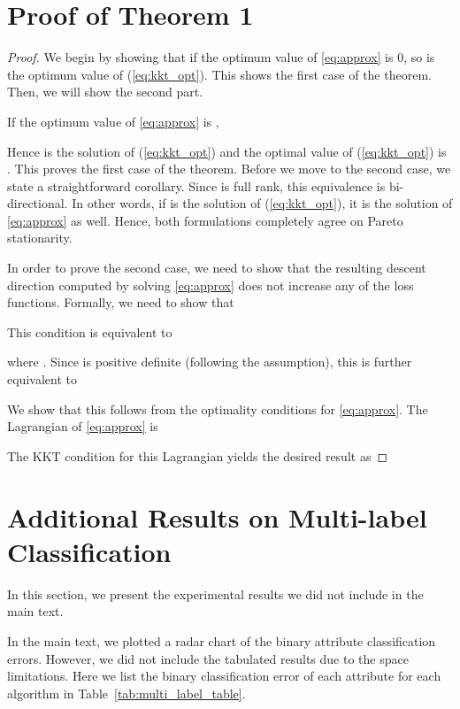 \documentclass{article}
\begin{document}
\appendix
\section{Proof of Theorem 1}


\begin{proof}
We begin by showing that if the optimum value of \ref{eq:approx} is 0, so is the optimum value of (\ref{eq:kkt_opt}). This shows the first case of the theorem. Then, we will show the second part.

If the optimum value of \ref{eq:approx} is ,


Hence  is the solution of (\ref{eq:kkt_opt}) and the optimal value of (\ref{eq:kkt_opt}) is . This proves the first case of the theorem. Before we move to the second case, we state a straightforward corollary. Since  is  full rank, this equivalence is bi-directional. In other words, if  is the solution of (\ref{eq:kkt_opt}), it is the solution of \ref{eq:approx} as well. Hence, both formulations completely agree on Pareto stationarity.


In order to prove the second case, we need to show that the resulting descent direction computed by solving \ref{eq:approx} does not increase any of the loss functions. Formally, we need to show that



This condition is equivalent to

where . Since  is positive definite (following the assumption), this is further equivalent to


We show that this follows from the optimality conditions for \ref{eq:approx}. The Lagrangian of \ref{eq:approx} is


The KKT condition for this Lagrangian yields the desired result as

\end{proof}
 \section{Additional Results on Multi-label Classification}


In this section, we present the experimental results we did not include in the main text. 

\label{sec:multi_label_error}
In the main text, we plotted a radar chart of the binary attribute classification errors. However, we did not include the tabulated results due to the space limitations. Here we list the binary classification error of each attribute for each algorithm in Table~\ref{tab:multi_label_table}.
\end{document}
